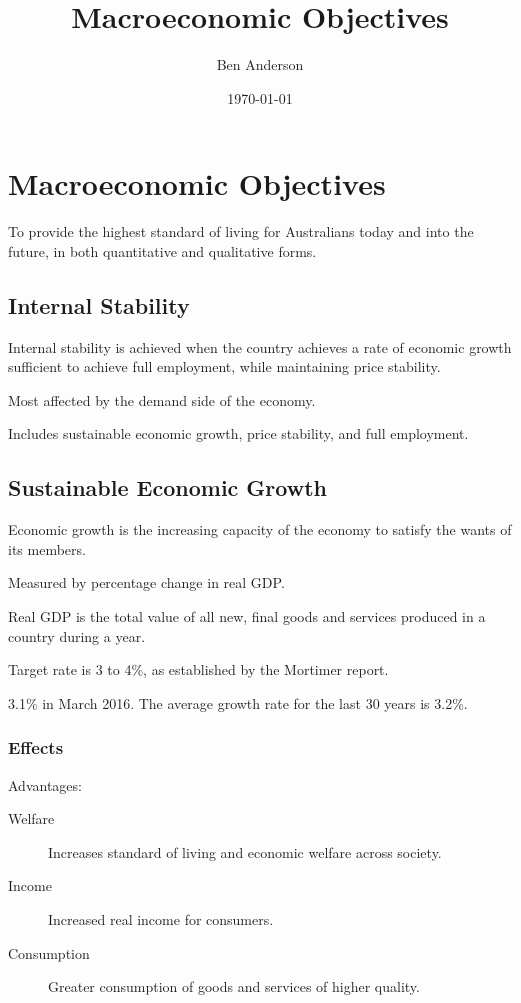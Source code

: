 \documentclass[a4paper,11pt]{article}
\begin{document}
\title{Macroeconomic Objectives}
\author{Ben Anderson}
\date{\today}
\maketitle
\pagebreak

\tableofcontents
\pagebreak


\section{Macroeconomic Objectives}

To provide the highest standard of living for Australians today and into the
future, in both quantitative and qualitative forms.


\subsection{Internal Stability}

Internal stability is achieved when the country achieves a rate of economic
growth sufficient to achieve full employment, while maintaining price stability.

Most affected by the demand side of the economy.

Includes sustainable economic growth, price stability, and full employment.


\subsection{Sustainable Economic Growth}

Economic growth is the increasing capacity of the economy to satisfy the wants
of its members.

Measured by percentage change in real GDP.

Real GDP is the total value of all new, final goods and services produced in a
country during a year.

Target rate is 3 to 4\%, as established by the Mortimer report.

3.1\% in March 2016. The average growth rate for the last 30 years is 3.2\%.


\subsubsection{Effects}

Advantages:

\begin{description}
\item [Welfare] Increases standard of living and economic welfare across
	society.
\item [Income] Increased real income for consumers.
\item [Consumption] Greater consumption of goods and services of higher quality.
\end{description}
\end{document}
